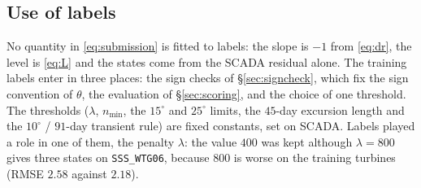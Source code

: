\documentclass[11pt,a4paper]{article}
\theoremstyle{remark}
\newcommand{\dg}{^{\circ}}
\newcommand{\code}[1]{\texttt{#1}}
\begin{document}
\subsection{Use of labels}\label{sec:labeluse}
No quantity in \eqref{eq:submission} is fitted to labels: the slope is $-1$ from
\eqref{eq:dr}, the level is \eqref{eq:L} and the states come from the SCADA
residual alone. The training labels enter in three places: the sign checks
of \S\ref{sec:signcheck}, which fix the sign convention of $\theta$, the
evaluation of \S\ref{sec:scoring}, and the choice of one threshold. The thresholds
($\lambda$, $n_{\min}$, the $15\dg$ and $25\dg$ limits, the $45$-day excursion
length and the $10\dg$ / $91$-day transient rule) are fixed constants, set on
SCADA. Labels played a role in one of them, the penalty $\lambda$: the value
$400$ was kept although $\lambda=800$ gives three states on
\code{SSS\_WTG06}, because $800$ is worse on the training turbines (RMSE
$2.58$ against $2.18$).
\end{document}
